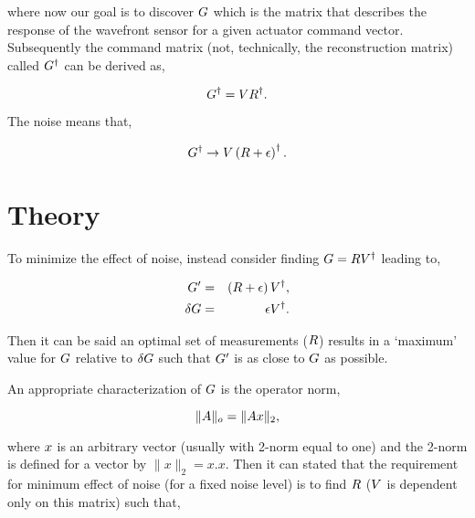 \documentclass[a4paper]{article}
\begin{document}
where now our goal is to discover $\mathnormal{G}$ which is the matrix that
describes the response of the wavefront sensor for a given actuator command
vector. Subsequently the command matrix (not, technically, the reconstruction
matrix) called $\mathnormal{G}^{\dagger}$ can be derived as,

\begin{equation}
   \mathnormal{G}^{\dagger}=\mathnormal{V}\mathnormal{R}^{\dagger}.
   \label{eqn:gplus}
\end{equation}

The noise means that,

\begin{equation}
   \mathnormal{G}^{\dagger}\rightarrow\mathnormal{V}\left(
      \mathnormal{R}+\mathnormal{\epsilon}\right)^{\dagger}.
   \label{eqn:noisygplus}
\end{equation}

\section{Theory}

To minimize the effect of noise, instead consider finding
$\mathnormal{G}=\mathnormal{R}\mathnormal{V}^{\dagger}$ leading to,

\begin{eqnarray}
   \mathnormal{G'}&=&
      \left(\mathnormal{R}+\mathnormal{\epsilon}\right)\mathnormal{V}^{\dagger},\\
   \delta\mathnormal{G}&=&\mathnormal{\epsilon}\mathnormal{V}^{\dagger}.
\end{eqnarray}

Then it can be said an optimal set of measurements ($\mathnormal{R}$) results in a
`maximum' value for $\mathnormal{G}$ relative to $\delta\mathnormal{G}$ such that
$\mathnormal{G'}$ is as close to $\mathnormal{G}$ as possible.

An appropriate characterization of $\mathnormal{G}$ is the operator norm,

\begin{equation*}
   \|\mathnormal{A}\|_{o}= \|\mathnormal{A}\mathnormal{x}\|_{2},
\end{equation*}

where $\mathnormal{x}$ is an arbitrary vector (usually with 2-norm equal to one)
and the 2-norm is defined for a vector by $\|x\|_{2}=x.x$. Then it can stated
that the requirement for minimum effect of noise (for a fixed noise level) is
to find $\mathnormal{R}$ ($\mathnormal{V}$ is dependent only on this matrix) such that,
\end{document}
